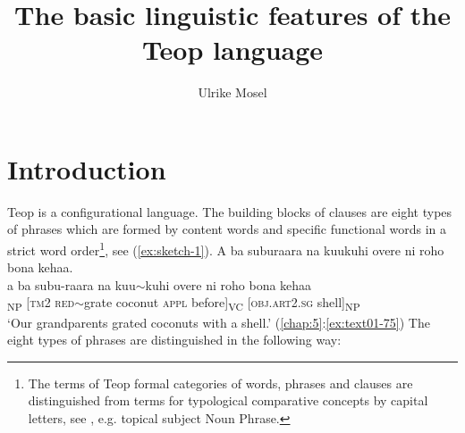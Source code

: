 \documentclass[output=paper]{langscibook}
\title{The basic linguistic features of the Teop language}
\author{Ulrike Mosel}
\begin{document}
\maketitle\label{chap:3}
\section{Introduction}
Teop is a configurational language. The building blocks of clauses are eight types of phrases which are formed by content words and specific functional words in a strict word order\footnote{The terms of Teop formal categories of words, phrases and clauses are distinguished from terms for typological comparative concepts by capital letters, see \textcite{Haspelmath:2016mf}, e.g. topical subject Noun Phrase.}, see (\ref{ex:sketch-1}). 
\ea\label{ex:sketch-1}
    A ba suburaara na kuukuhi overe ni roho bona kehaa.\\
    \gll a ba subu-raara na kuu{$\sim$}kuhi overe ni roho bona kehaa\\
    [\textsc{art}2.\textsc{sg}	\textsc{kin}.\textsc{pl}	grandparent-1\textsc{pl}.\textsc{in}.\textsc{poss}.\textsc{pron}]\textsubscript{NP} [\textsc{tm}2 \textsc{red}{$\sim$}grate coconut \textsc{appl} before]\textsubscript{VC} [\textsc{obj}.\textsc{art}2.\textsc{sg} shell]\textsubscript{NP}\\
    \glt `Our grandparents grated coconuts with a shell.' (\ref{chap:5}:\ref{ex:text01-75})
\z
The eight types of phrases are distinguished in the following way:
\end{document}
